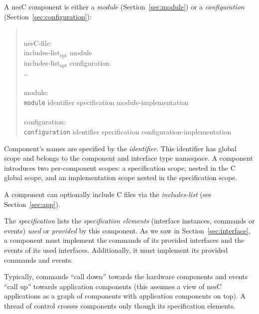 \documentclass[11pt,letterpaper]{article}
\newcommand{\kw}[1]{{\tt #1}}
\newcommand{\nesc}{nesC\xspace}
\newcommand{\opt}{$_{\mbox{opt}}$\xspace}
\newcommand{\grammarshift}{\vspace*{-.7cm}}
\newcommand{\grammarindent}{\hspace*{2cm}\= \\ \kill}
\begin{document}
A \nesc component is either a \emph{module} (Section~\ref{sec:module}) or a
\emph{configuration} (Section~\ref{sec:configuration}):
\begin{quote} \grammarshift
\em \begin{tabbing}
\grammarindent
nesC-file: \\
\>	includes-list\opt module\\
\>	includes-list\opt configuration\\
\>	\ldots\\
\\
module:\\
\>	\kw{module} identifier specification module-implementation\\
\\
configuration:\\
\>	\kw{configuration} identifier specification configuration-implementation\\
\end{tabbing} \end{quote}

Component's names are specified by the \emph{identifier}. This identifier
has global scope and belongs to the component and interface type namespace.
A component introduces two per-component scopes: a specification scope,
nested in the C global scope, and an implementation scope nested in the
specification scope.

A component can optionally include C files via the \emph{includes-list}
(see Section~\ref{sec:app}).

The \emph{specification} lists the \emph{specification elements} (interface
instances, commands or events) \emph{used} or \emph{provided} by this
component. As we saw in Section~\ref{sec:interface}, a component must
implement the commands of its provided interfaces and the events of its
used interfaces. Additionally, it must implement its provided commands and
events.

Typically, commands ``call down'' towards the hardware components and
events ``call up'' towards application components (this assumes a view of
\nesc applications as a graph of components with application components on
top). A thread of control crosses components only though its specification
elements.
\end{document}
